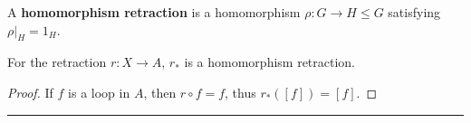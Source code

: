 \begin{defn} A \textbf{homomorphism retraction} is a homomorphism $\rho:G\rightarrow H\leq G$ satisfying $\rho|_H=1_H$.
\end{defn}
\begin{prop} For the retraction $r:X\rightarrow A$, $r_*$ is a homomorphism retraction.
\end{prop}
\begin{proof}
If $f$ is a loop in $A$, then $r\circ f=f$, thus $r_*([f])=[f]$.
\end{proof}
\noindent\rule{\textwidth}{1pt}
\newline